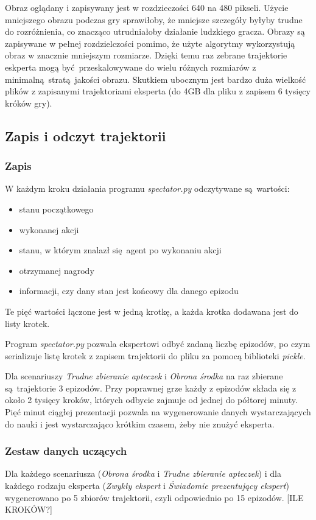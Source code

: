 Obraz oglądany i zapisywany jest w rozdzieczości 640 na 480 pikseli. Użycie mniejszego obrazu podczas gry sprawiłoby, że mniejsze szczegóły byłyby trudne do rozróżnienia, co znacząco utrudniałoby działanie ludzkiego gracza. Obrazy są zapisywane w pełnej rozdzielczości pomimo, że użyte algorytmy wykorzystują obraz w znacznie mniejszym rozmiarze. Dzięki temu raz zebrane trajektorie eskperta mogą być przeskalowywane do wielu różnych rozmiarów z minimalną stratą jakości obrazu. Skutkiem ubocznym jest bardzo duża wielkość plików z zapisanymi trajektoriami eksperta (do 4GB dla pliku z zapisem 6 tysięcy króków gry).

\subsection{Zapis i odczyt trajektorii}
\subsubsection{Zapis}
W każdym kroku działania programu \textit{spectator.py} odczytywane są wartości:

\begin{itemize}
\item{stanu początkowego}
\item{wykonanej akcji}
\item{stanu, w którym znalazł się agent po wykonaniu akcji}
\item{otrzymanej nagrody}
\item{informacji, czy dany stan jest końcowy dla danego epizodu}
\end{itemize}

Te pięć wartości łączone jest w jedną krotkę, a każda krotka dodawana jest do listy krotek.

Program \textit{spectator.py} pozwala ekspertowi odbyć zadaną liczbę epizodów, po czym serializuje listę krotek z zapisem trajektorii do pliku za pomocą biblioteki \textit{pickle}.

Dla scenariuszy \textit{Trudne zbieranie apteczek} i \textit{Obrona środka} na raz zbierane są trajektorie 3 epizodów. Przy poprawnej grze każdy z epizodów składa się z około 2 tysięcy kroków, których odbycie zajmuje od jednej do półtorej minuty. Pięć minut ciągłej prezentacji pozwala na wygenerowanie danych wystarczających do nauki i jest wystarczająco krótkim czasem, żeby nie znużyć eksperta.

\subsubsection{Zestaw danych uczących}
Dla każdego scenariusza (\textit{Obrona środka} i \textit{Trudne zbieranie apteczek}) i dla każdego rodzaju eksperta (\textit{Zwykły ekspert} i \textit{Świadomie prezentujący ekspert}) wygenerowano po 5 zbiorów trajektorii, czyli odpowiednio po 15 epizodów.
[ILE KROKÓW?]

